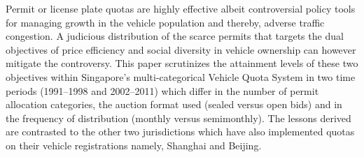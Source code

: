 Permit or license plate quotas are highly effective albeit controversial policy tools for managing growth in the vehicle population and thereby, adverse traffic congestion. A judicious distribution of the scarce permits that targets the dual objectives of price efficiency and social diversity in vehicle ownership can however mitigate the controversy. This paper scrutinizes the attainment levels of these two objectives within Singapore’s multi-categorical Vehicle Quota System in two time periods (1991–1998 and 2002–2011) which differ in the number of permit allocation categories, the auction format used (sealed versus open bids) and in the frequency of distribution (monthly versus semimonthly). The lessons derived are contrasted to the other two jurisdictions which have also implemented quotas on their vehicle registrations namely, Shanghai and Beijing.
